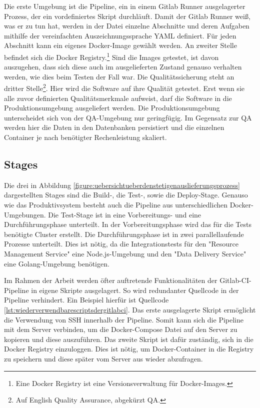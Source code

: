 Die erste Umgebung ist die Pipeline, ein in einem
Gitlab Runner ausgelagerter Prozess, der ein vordefiniertes Skript durchläuft.
Damit der Gitlab Runner weiß, was er zu tun hat, werden in der 
Datei einzelne Abschnitte und deren Aufgaben mithilfe der vereinfachten
Auszeichnungssprache YAML definiert. Für jeden Abschnitt kann ein eigenes Docker-Image
gewählt werden. An zweiter Stelle befindet sich die Docker Registry.\footnote{Eine Docker Registry ist eine Versionsverwaltung für Docker-Images.}
Sind die Images getestet, ist davon auszugehen, dass sich diese auch
im ausgelieferten Zustand genauso verhalten werden, wie dies beim Testen
der Fall war. Die Qualitätssicherung steht an dritter Stelle\footnote{Auf English Quality Assurance, abgekürzt QA.}.
Hier wird die Software auf ihre Qualität getestet. Erst wenn sie alle
zuvor definierten Qualitätsmerkmale aufweist, darf die Software in die Produktionsumgebung
ausgeliefert werden. Die Produktionsumgebung unterscheidet sich von der QA-Umgebung
nur geringfügig. Im Gegensatz zur QA werden hier die Daten in den Datenbanken persistiert und die
einzelnen Container je nach benötigter Rechenleistung skaliert.

\subsection{Stages}
\label{subsec:stages}
Die drei in Abbildung \ref{figure:uebersichtueberdenstetigenauslieferungsprozess} dargestellten Stages sind
die \mbox{Build-,} die \mbox{Test-,} sowie die Deploy-Stage. Genauso wie das Produktivsystem
besteht auch die Pipeline aus unterschiedlichen Docker-Umgebungen. Die Test-Stage ist in eine Vorbereitungs-
und eine Durchführungsphase unterteilt. In der Vorbereitungsphase wird das für die Tests
benötigte Cluster erstellt. Die Durchführungsphase ist in zwei parallellaufende Prozesse
unterteilt. Dies ist nötig, da die Integrationstests für den "Resource Management Service"
eine Node.js-Umgebung und den "Data Delivery Service" eine Golang-Umgebung benötigen.

Im Rahmen der Arbeit werden öfter auftretende Funktionalitäten
der Gitlab-CI-Pipeline in eigene Skripte ausgelagert.
So wird redundanter Quellcode in der Pipeline verhindert. Ein Beispiel hierfür
ist Quellcode \ref{lst:wiederverwendbarescriptsdergitlabci}. Das erste ausgelagerte
Skript ermöglicht die Verwendung von SSH innerhalb der Pipeline. Somit kann sich
die Pipeline mit dem Server verbinden, um die Docker-Compose Datei auf den Server
zu kopieren und diese auszuführen. Das zweite Skript ist dafür zuständig,
sich in die Docker Registry einzuloggen. Dies ist nötig, um Docker-Container
in die Registry zu speichern und diese später vom Server aus wieder abzufragen.

